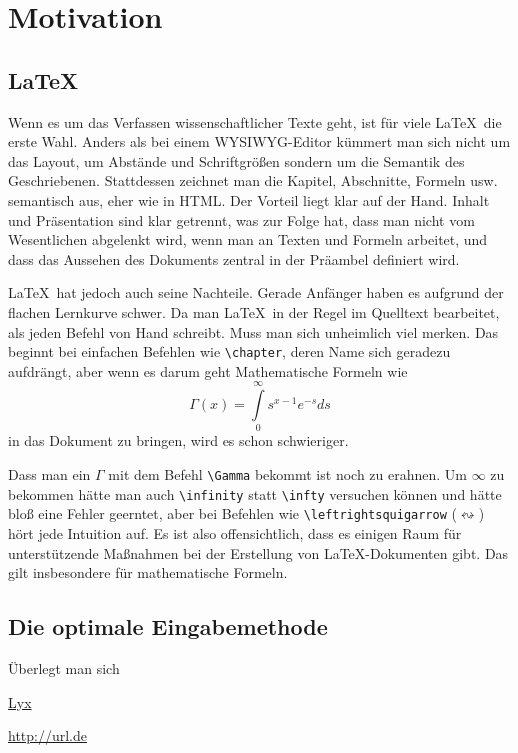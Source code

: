 \chapter{Motivation}

\section*{\LaTeX}

Wenn es um das Verfassen wissenschaftlicher Texte geht, ist für viele \LaTeX\ die erste Wahl. Anders als bei einem \acs{WYSIWYG}-Editor kümmert man sich nicht um das Layout, um Abstände und Schriftgrößen sondern um die Semantik des Geschriebenen. Stattdessen zeichnet man die Kapitel, Abschnitte, Formeln usw. semantisch aus, eher wie in \acs{HTML}. Der Vorteil liegt klar auf der Hand. Inhalt und Präsentation sind klar getrennt, was zur Folge hat, dass man nicht vom Wesentlichen abgelenkt wird, wenn man an Texten und Formeln arbeitet, und dass das Aussehen des Dokuments zentral in der Präambel definiert wird.

\LaTeX\ hat jedoch auch seine Nachteile. Gerade Anfänger haben es aufgrund der flachen Lernkurve schwer. Da man \LaTeX\ in der Regel im Quelltext bearbeitet, als jeden Befehl von Hand schreibt. Muss man sich unheimlich viel merken. Das beginnt bei einfachen Befehlen wie \texttt{\textbackslash chapter}, deren Name sich geradezu aufdrängt, aber wenn es darum geht Mathematische Formeln wie $$\Gamma \left( x \right) = \int\limits_0^\infty  {s^{x - 1} e^{ - s} ds}$$ in das Dokument zu bringen, wird es schon schwieriger.

Dass man ein $\Gamma$ mit dem Befehl \texttt{\textbackslash Gamma} bekommt ist noch zu erahnen. Um $\infty$ zu bekommen hätte man auch \texttt{\textbackslash infinity} statt \texttt{\textbackslash infty} versuchen können und hätte bloß eine Fehler geerntet, aber bei Befehlen wie \texttt{\textbackslash leftrightsquigarrow} ($\leftrightsquigarrow$) hört jede Intuition auf. Es ist also offensichtlich, dass es einigen Raum für unterstützende Maßnahmen bei der Erstellung von \LaTeX-Dokumenten gibt. Das gilt insbesondere für mathematische Formeln.

\section*{Die optimale Eingabemethode}

Überlegt man sich


\href{http://lyx.org}{Lyx}

\url{http://url.de}